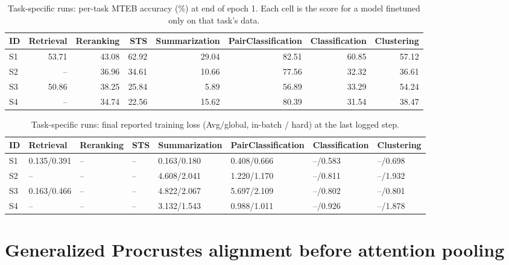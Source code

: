 \documentclass{article}
\begin{document}
\begin{table}[ht]
\centering
\small
\setlength{\tabcolsep}{4pt}
\caption{Task-specific runs: per-task MTEB accuracy (\%) at end of epoch 1. Each cell is the score for a model finetuned only on that task's data.}
\label{tab:ts-perf}
\begin{tabular}{lrrrrrrr}
\toprule
ID & Retrieval & Reranking & STS & Summarization & PairClassification & Classification & Clustering \\
\midrule
S1 & 53.71 & 43.08 & 62.92 & 29.04 & 82.51 & 60.85 & 57.12 \\
S2 & -- & 36.96 & 34.61 & 10.66 & 77.56 & 32.32 & 36.61 \\
S3 & 50.86 & 38.25 & 25.84 & 5.89 & 56.89 & 33.29 & 54.24 \\
S4 & -- & 34.74 & 22.56 & 15.62 & 80.39 & 31.54 & 38.47 \\
\bottomrule
\end{tabular}
\end{table}

\begin{table}[ht]
\centering
\small
\setlength{\tabcolsep}{4pt}
\caption{Task-specific runs: final reported training loss (Avg/global, in-batch / hard) at the last logged step.}
\label{tab:ts-train-loss}
\begin{tabular}{llllllll}
\toprule
ID & Retrieval & Reranking & STS & Summarization & PairClassification & Classification & Clustering \\
\midrule
S1 & 0.135/0.391 & -- & -- & 0.163/0.180 & 0.408/0.666 & --/0.583 & --/0.698 \\
S2 & -- & -- & -- & 4.608/2.041 & 1.220/1.170 & --/0.811 & --/1.932 \\
S3 & 0.163/0.466 & -- & -- & 4.822/2.067 & 5.697/2.109 & --/0.802 & --/0.801 \\
S4 & -- & -- & -- & 3.132/1.543 & 0.988/1.011 & --/0.926 & --/1.878 \\
\bottomrule
\end{tabular}
\end{table}






\clearpage


\section{Generalized Procrustes alignment before attention pooling}
\label{sec:procrustes}
\end{document}

